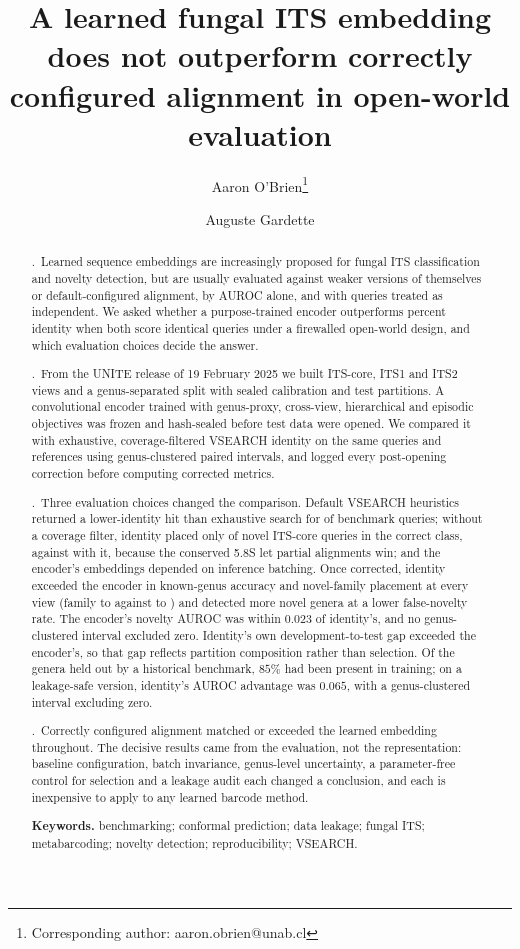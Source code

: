 \documentclass[11pt]{article}
\title{\textbf{A learned fungal ITS embedding does not outperform correctly
configured alignment in open-world evaluation}}
\author[1]{Aaron O'Brien\thanks{Corresponding author: aaron.obrien@unab.cl}}
\author[2]{Auguste Gardette}
\affil[1]{Centro de Biotecnolog\'ia de Sistemas, Universidad Andr\'es Bello, Santiago, Chile}
\affil[2]{IRD, Sorbonne University, UMMISCO, 4 place Jussieu, Paris, France}
\date{}
\begin{document}
\maketitle

\begin{abstract}
.~Learned sequence embeddings are increasingly proposed for fungal ITS
classification and novelty detection, but are usually evaluated against weaker
versions of themselves or default-configured alignment, by AUROC alone, and with
queries treated as independent. We asked whether a purpose-trained encoder
outperforms percent identity when both score identical queries under a
firewalled open-world design, and which evaluation choices decide the answer.

.~From the UNITE release of 19 February 2025 we built ITS-core, ITS1 and ITS2
views and a genus-separated split with sealed calibration and test partitions. A
convolutional encoder trained with genus-proxy, cross-view, hierarchical and
episodic objectives was frozen and hash-sealed before test data were opened. We
compared it with exhaustive, coverage-filtered VSEARCH identity on the same
queries and references using genus-clustered paired intervals, and logged every
post-opening correction before computing corrected metrics.

.~Three evaluation choices changed the comparison. Default VSEARCH heuristics
returned a lower-identity hit than exhaustive search for \AudAllImpPct{} of
benchmark queries; without a coverage filter, identity placed only
\CovNoneCls{} of novel ITS-core queries in the correct class, against
\CovEightCls{} with it, because the conserved 5.8S let partial alignments win;
and the encoder's embeddings depended on inference batching. Once corrected,
identity exceeded the encoder in known-genus accuracy and novel-family placement
at every view (family \IdFamTwo{} to \IdFamCore{} against \MfFamTwo{} to
\MfFamCore{}) and detected more novel genera at a lower false-novelty rate. The
encoder's novelty AUROC was within $0.023$ of identity's, and no genus-clustered
interval excluded zero. Identity's own development-to-test gap exceeded the
encoder's, so that gap reflects partition composition rather than selection. Of
the genera held out by a historical benchmark, $85\%$ had been present in
training; on a leakage-safe version, identity's AUROC advantage was $0.065$,
with a genus-clustered interval excluding zero.

.~Correctly configured alignment matched or exceeded the learned embedding
throughout. The decisive results came from the evaluation, not the
representation: baseline configuration, batch invariance, genus-level
uncertainty, a parameter-free control for selection and a leakage audit each
changed a conclusion, and each is inexpensive to apply to any learned barcode
method.

\vspace{0.6em}
\noindent
\textbf{Keywords.} benchmarking; conformal prediction; data leakage; fungal ITS;
metabarcoding; novelty detection; reproducibility; VSEARCH.
\end{abstract}
\end{document}
